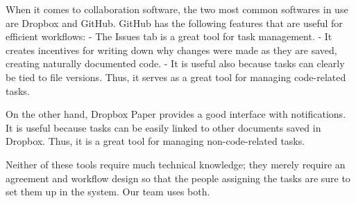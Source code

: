 When it comes to collaboration software,
the two most common softwares in use are Dropbox and GitHub.
GitHub has the following features that are useful for efficient workflows:
- The Issues tab is a great tool for task management.
- It creates incentives for writing down why changes were made as they are saved, creating naturally documented code.
- It is useful also because tasks can clearly be tied to file versions. Thus, it serves as a great tool for
managing code-related tasks.

On the other hand, Dropbox Paper provides a good interface with notifications. It is useful because tasks can be easily linked to other documents saved in Dropbox. Thus, it is a great tool for managing non-code-related tasks.

Neither of these tools require much technical knowledge; they merely require an agreement and workflow design
so that the people assigning the tasks are sure to set them up in the system. Our team uses both.
